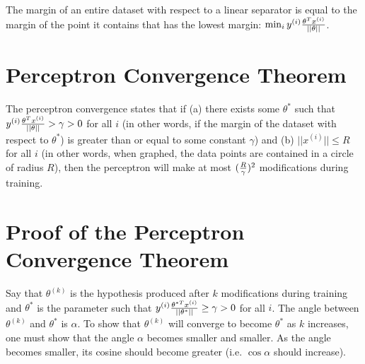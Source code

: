\documentclass{article}
\begin{document}
    The margin of an entire dataset with respect to a linear separator is equal to the margin of the point it contains that has the lowest margin: $\min_{i}{y^{(i)}{{\theta^Tx^{(i)}}\over{||\theta||}}}$.

    \section{Perceptron Convergence Theorem}
    The perceptron convergence states that if (a) there exists some $\theta^*$ such that $y^{(i)}{{\theta^Tx^{(i)}}\over{||\theta||}}>\gamma>0$ for all $i$ (in other words, if the margin of the dataset with respect to $\theta^*$) is greater than or equal to some constant $\gamma$) and (b) $||x^{(i)}||\leq{R}$ for all $i$ (in other words, when graphed, the data points are contained in a circle of radius $R$), then the perceptron will make at most $({{R}\over{\gamma}})^2$ modifications during training. 

    \section{Proof of the Perceptron Convergence Theorem}
    Say that $\theta^{(k)}$ is the hypothesis produced after $k$ modifications during training and $\theta^*$ is the parameter such that $y^{(i)}{{\theta^{*T}x^{(i)}}\over{||\theta^*||}}\geq\gamma>0$ for all $i$. The angle between $\theta^{(k)}$ and $\theta^*$ is $\alpha$. To show that $\theta^{(k)}$ will converge to become $\theta^*$ as $k$ increases, one must show that the angle $\alpha$ becomes smaller and smaller. As the angle becomes smaller, its cosine should become greater (i.e. $\cos{\alpha}$ should increase). 
\end{document}
